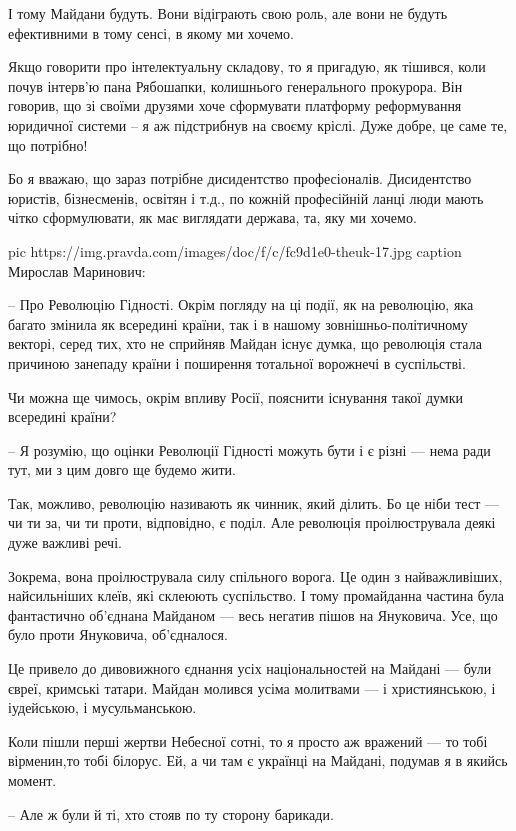 І тому Майдани будуть. Вони відіграють свою роль, але вони не будуть
ефективними в тому сенсі, в якому ми хочемо. 

Якщо говорити про інтелектуальну складову, то я пригадую, як тішився, коли
почув інтерв’ю пана Рябошапки, колишнього генерального прокурора. Він говорив,
що зі своїми друзями хоче сформувати платформу реформування юридичної системи –
я аж підстрибнув на своєму кріслі. Дуже добре, це саме те, що потрібно!

Бо я вважаю, що зараз потрібне дисидентство професіоналів. Дисидентство
юристів, бізнесменів, освітян і т.д., по кожній професійній ланці люди мають
чітко сформулювати, як має виглядати держава, та, яку ми хочемо.

\ifcmt
pic https://img.pravda.com/images/doc/f/c/fc9d1e0-theuk-17.jpg
caption Мирослав Маринович: 
\fi

– Про Революцію Гідності. Окрім погляду на ці події, як на революцію, яка
багато змінила як всередині країни, так і в нашому зовнішньо-політичному
векторі, серед тих, хто не сприйняв Майдан існує думка, що революція стала
причиною занепаду країни і поширення тотальної ворожнечі в суспільстві. 

Чи можна ще чимось, окрім впливу Росії, пояснити існування такої думки
всередині країни?  

– Я розумію, що оцінки Революції Гідності можуть бути і є різні --- нема ради
тут, ми з цим довго ще будемо жити. 

Так, можливо, революцію називають як чинник, який ділить. Бо це ніби тест --- чи
ти за, чи ти проти, відповідно, є поділ. Але революція проілюструвала деякі
дуже важливі речі. 

Зокрема, вона проілюструвала силу спільного ворога. Це один з найважливіших,
найсильніших клеїв, які склеюють суспільство. І тому промайданна частина була
фантастично об’єднана Майданом --- весь негатив пішов на Януковича. Усе, що було
проти Януковича, об’єдналося. 

Це привело до дивовижного єднання усіх національностей на Майдані --- були євреї,
кримські татари. Майдан молився усіма молитвами --- і християнською, і
іудейською, і мусульманською. 

Коли пішли перші жертви Небесної сотні, то я просто аж вражений --- то тобі
вірменин,то тобі білорус. Ей, а чи там є українці на Майдані, подумав я в
якийсь момент. 

– Але ж були й ті, хто стояв по ту сторону барикади.

